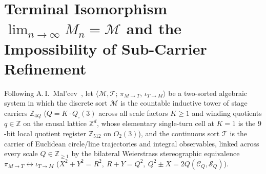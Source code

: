 \documentclass[11pt,a4paper]{article}
\theoremstyle{definition}
\theoremstyle{remark}
\begin{document}
\section{Terminal Isomorphism $\lim_{n\to\infty} M_n = \mathcal{M}$ and the Impossibility of Sub-Carrier Refinement}
\label{sec:terminal-limit}

Following A.\,I.~Mal'cev~\cite{Malcev1973}, let $\langle\mathcal{M},\mathcal{T};\,\pi_{M\to T},\,\iota_{T\to M}\rangle$ be a two-sorted algebraic system in which the discrete sort $\mathcal{M}$ is the countable inductive tower of stage carriers $\mathbb{Z}_{4Q}$ ($Q = K\cdot Q_\square(3)$ across all scale factors $K\ge 1$ and winding quotients $q\in\mathbb{Z}$ on the causal lattice $\mathbb{Z}^d$, whose elementary single-turn cell at $K=1$ is the $9$-bit local quotient register $\mathbb{Z}_{512}$ on $O_2(3)$), and the continuous sort $\mathcal{T}$ is the carrier of Euclidean circle/line trajectories and integral observables, linked across every scale $Q\in\mathbb{Z}_{\ge 1}$ by the bilateral Weierstrass stereographic equivalence $\pi_{M\to T} \leftrightarrow \iota_{T\to M}$ ($X^2+Y^2=R^2,\ R+Y=Q^2,\ Q^2\pm X = 2Q(\mathcal{C}_Q,\mathcal{S}_Q)$).
\end{document}
